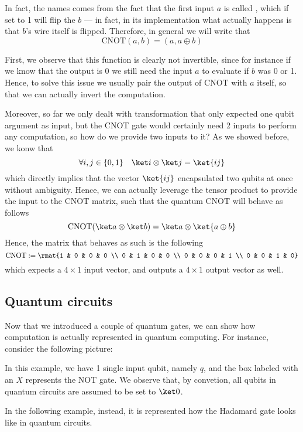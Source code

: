 \documentclass[a4paper, 12pt]{report}
\begin{document}
In fact, the names comes from the fact that the first input $a$ is called , which if set to 1 will flip the  $b$ --- in fact, in its implementation what actually happens is that $b$'s wire itself is flipped. Therefore, in general we will write that $$\mbox{CNOT}(a, b) = (a, a \oplus b)$$

First, we observe that this function is clearly not invertible, since for instance if we know that the output is 0 we still need the input $a$ to evaluate if $b$ was 0 or 1. Hence, to solve this issue we usually pair the output of CNOT with $a$ itself, so that we can actually invert the computation.

Moreover, so far we only dealt with transformation that only expected one qubit argument as input, but the CNOT gate would certainly need 2 inputs to perform any computation, so how do we provide two inputs to it? As we showed before, we konw that $$\forall i, j \in \{0, 1\} \quad \ket i \otimes \ket j = \ket{i j}$$ which directly implies that the vector $\ket{ij}$ encapsulated two qubits at once without ambiguity. Hence, we can actually leverage the tensor product to provide the input to the CNOT matrix, such that the quantum CNOT will behave as follows $$\mbox{CNOT}(\ket a \otimes \ket b) = \ket a \otimes \ket{a \oplus b}$$ Hence, the matrix that behaves as such is the following $$\mbox{CNOT} := \rmat{1 & 0 & 0 & 0 \\ 0 & 1 & 0 & 0 \\ 0 & 0 & 0 & 1 \\ 0 & 0 & 1 & 0}$$ which expects a $4 \times 1$ input vector, and outputs a $4 \times 1$ output vector as well.

\subsection{Quantum circuits}

Now that we introduced a couple of quantum gates, we can show how computation is actually represented in quantum computing. For instance, consider the following picture:


In this example, we have 1 single input qubit, namely $q$, and the box labeled with an $X$ represents the NOT gate. We observe that, by convetion, all qubits in quantum circuits are assumed to be set to $\ket 0$.

In the following example, instead, it is represented how the Hadamard gate looks like in quantum circuits.
\end{document}
